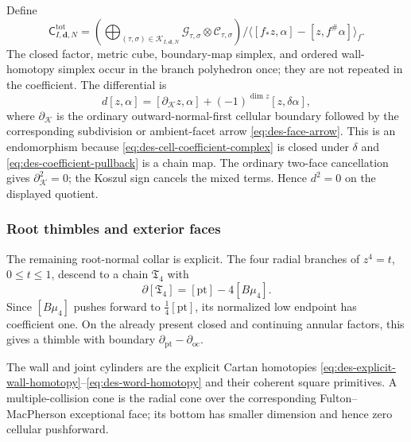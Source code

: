 Define
\begin{equation}
 \mathsf C^{\mathrm{tot}}_{I,\mathbf d,N}
 =\left(\bigoplus_{(\tau,\sigma)\in\mathcal K_{I,\mathbf d,N}}
 \mathcal G_{\tau,\sigma}\otimes\mathcal C_{\tau,\sigma}\right)
 \Big/\langle[f_*z,\alpha]-[z,f^\#\alpha]\rangle_f.
 \label{eq:des-coend}
\end{equation}
The closed factor, metric cube, boundary-map simplex, and ordered
wall-homotopy simplex occur in the branch polyhedron once; they are not
repeated in the coefficient.  The differential
is
\begin{equation}
 d[z,\alpha]=[\partial_{\mathcal K}z,\alpha]
 +(-1)^{\dim z}[z,\delta\alpha],
 \label{eq:des-total-differential}
\end{equation}
where $\partial_{\mathcal K}$ is the ordinary outward-normal-first cellular
boundary followed by the corresponding subdivision or ambient-facet arrow
\eqref{eq:des-face-arrow}.  This
is an endomorphism because \eqref{eq:des-cell-coefficient-complex} is closed
under $\delta$ and \eqref{eq:des-coefficient-pullback} is a chain map.  The
ordinary two-face cancellation gives $\partial_{\mathcal K}^2=0$; the Koszul
sign cancels the mixed terms.  Hence $d^2=0$ on the displayed quotient.

\subsubsection{Root thimbles and exterior faces}

The remaining root-normal collar is explicit.  The four radial branches of
$z^4=t$, $0\leq t\leq1$, descend to a chain $\mathfrak T_4$ with
\begin{equation}
 \partial[\mathfrak T_4]=[\mathrm{pt}]-4[B\mu _4].
 \label{eq:des-thimble}
\end{equation}
Since $[B\mu _4]$ pushes forward to $\frac14[\mathrm{pt}]$, its normalized
low endpoint has coefficient one.  On the already present closed and
continuing annular factors, this gives a thimble with boundary
$\partial_{\mathrm{pt}}-\partial_{\mathrm{oc}}$.

The wall and joint cylinders are the explicit Cartan homotopies
\eqref{eq:des-explicit-wall-homotopy}--\eqref{eq:des-word-homotopy} and their
coherent square primitives.  A multiple-collision cone is the radial cone over
the corresponding Fulton--MacPherson exceptional face; its bottom has
smaller dimension and hence zero cellular pushforward.

